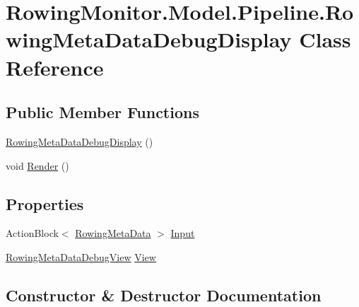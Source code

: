 \hypertarget{class_rowing_monitor_1_1_model_1_1_pipeline_1_1_rowing_meta_data_debug_display}{}\section{Rowing\+Monitor.\+Model.\+Pipeline.\+Rowing\+Meta\+Data\+Debug\+Display Class Reference}
\label{class_rowing_monitor_1_1_model_1_1_pipeline_1_1_rowing_meta_data_debug_display}
\subsection*{Public Member Functions}
\begin{DoxyCompactItemize}
\item 
\hyperlink{class_rowing_monitor_1_1_model_1_1_pipeline_1_1_rowing_meta_data_debug_display_af388cf5defbc14871168eeebb1f4dfb6}{Rowing\+Meta\+Data\+Debug\+Display} ()
\item 
void \hyperlink{class_rowing_monitor_1_1_model_1_1_pipeline_1_1_rowing_meta_data_debug_display_a29bf406aa629dac9c69277d4dc43d0c2}{Render} ()
\end{DoxyCompactItemize}
\subsection*{Properties}
\begin{DoxyCompactItemize}
\item 
Action\+Block$<$ \hyperlink{struct_rowing_monitor_1_1_model_1_1_util_1_1_rowing_meta_data}{Rowing\+Meta\+Data} $>$ \hyperlink{class_rowing_monitor_1_1_model_1_1_pipeline_1_1_rowing_meta_data_debug_display_a2f00aa60c9a8b1adfdc2e315b83df336}{Input}
\item 
\hyperlink{class_rowing_monitor_1_1_view_1_1_rowing_meta_data_debug_view}{Rowing\+Meta\+Data\+Debug\+View} \hyperlink{class_rowing_monitor_1_1_model_1_1_pipeline_1_1_rowing_meta_data_debug_display_a7f1b6ca457ce19e755f5b6708cc7c930}{View}
\end{DoxyCompactItemize}


\subsection{Constructor \& Destructor Documentation}
\mbox{\label{class_rowing_monitor_1_1_model_1_1_pipeline_1_1_rowing_meta_data_debug_display_af388cf5defbc14871168eeebb1f4dfb6}} 
